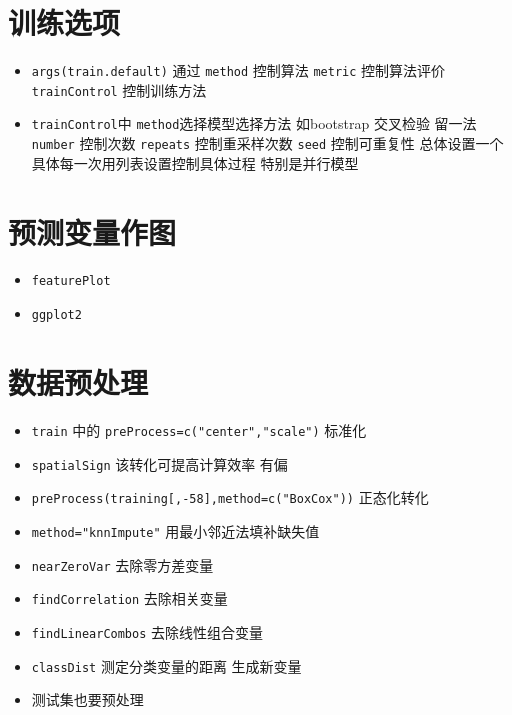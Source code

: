 \documentclass[]{book}
\providecommand{\tightlist}{%
  \setlength{\itemsep}{0pt}\setlength{\parskip}{0pt}}
\begin{document}
\hypertarget{ux8badux7ec3ux9009ux9879}{%
\section{训练选项}\label{ux8badux7ec3ux9009ux9879}}

\begin{itemize}
\tightlist
\item
  \texttt{args(train.default)} 通过 \texttt{method} 控制算法 \texttt{metric} 控制算法评价 \texttt{trainControl} 控制训练方法
\item
  \texttt{trainControl}中 \texttt{method}选择模型选择方法 如bootstrap 交叉检验 留一法 \texttt{number} 控制次数 \texttt{repeats} 控制重采样次数 \texttt{seed} 控制可重复性 总体设置一个 具体每一次用列表设置控制具体过程 特别是并行模型
\end{itemize}

\hypertarget{ux9884ux6d4bux53d8ux91cfux4f5cux56fe}{%
\section{预测变量作图}\label{ux9884ux6d4bux53d8ux91cfux4f5cux56fe}}

\begin{itemize}
\tightlist
\item
  \texttt{featurePlot}
\item
  \texttt{ggplot2}
\end{itemize}

\hypertarget{ux6570ux636eux9884ux5904ux7406}{%
\section{数据预处理}\label{ux6570ux636eux9884ux5904ux7406}}

\begin{itemize}
\tightlist
\item
  \texttt{train} 中的 \texttt{preProcess=c("center","scale")} 标准化
\item
  \texttt{spatialSign} 该转化可提高计算效率 有偏
\item
  \texttt{preProcess(training{[},-58{]},method=c("BoxCox"))} 正态化转化
\item
  \texttt{method="knnImpute"} 用最小邻近法填补缺失值
\item
  \texttt{nearZeroVar} 去除零方差变量
\item
  \texttt{findCorrelation} 去除相关变量
\item
  \texttt{findLinearCombos} 去除线性组合变量
\item
  \texttt{classDist} 测定分类变量的距离 生成新变量
\item
  测试集也要预处理
\end{itemize}
\end{document}
